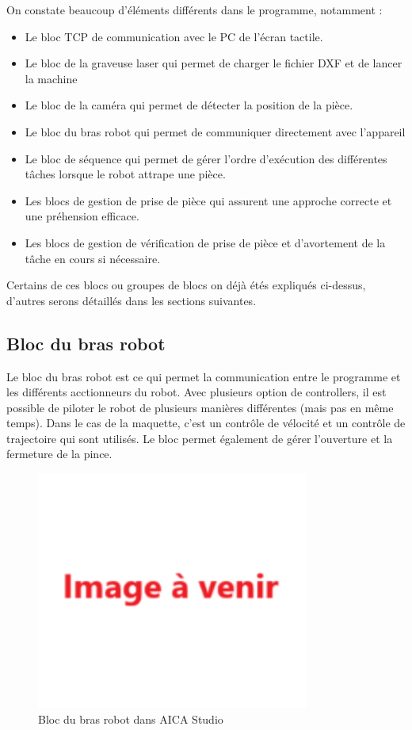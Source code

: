 On constate beaucoup d'éléments différents dans le programme, notamment :
\begin{itemize}
    \item Le bloc TCP de communication avec le PC de l'écran tactile.
    \item Le bloc de la graveuse laser qui permet de charger le fichier DXF et de lancer la machine
    \item Le bloc de la caméra qui permet de détecter la position de la pièce.
    \item Le bloc du bras robot qui permet de communiquer directement avec l'appareil
    \item Le bloc de séquence qui permet de gérer l'ordre d'exécution des différentes tâches lorsque le robot attrape une pièce.
    \item Les blocs de gestion de prise de pièce qui assurent une approche correcte et une préhension efficace.
    \item Les blocs de gestion de vérification de prise de pièce et d'avortement de la tâche en cours si nécessaire.
\end{itemize}

Certains de ces blocs ou groupes de blocs on déjà étés expliqués ci-dessus, d'autres serons détaillés dans les sections suivantes.

\subsection{Bloc du bras robot}

Le bloc du bras robot est ce qui permet la communication entre le programme et les différents acctionneurs du robot. Avec plusieurs option de controllers, il est possible de piloter le robot de plusieurs manières différentes (mais pas en même temps). Dans le cas de la maquette, c'est un contrôle de vélocité et un contrôle de trajectoire qui sont utilisés. Le bloc permet également de gérer l'ouverture et la fermeture de la pince.

\begin{figure}[H]
    \centering
    \includegraphics[width=0.8\textwidth]{assets/figures/img_a_venir.png}
    \caption{Bloc du bras robot dans AICA Studio}
    \label{fig:robot_block}
\end{figure}

